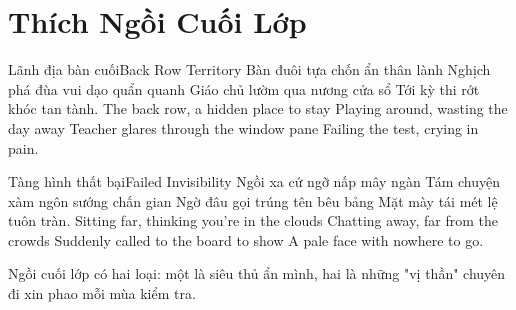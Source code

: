 \chapter{Thích Ngồi Cuối Lớp}

\begin{tutuyetbox}{Lãnh địa bàn cuối}{Back Row Territory}
Bàn đuôi tựa chốn ẩn thân lành
Nghịch phá đùa vui dạo quẩn quanh
Giáo chủ lườm qua nương cửa sổ
Tới kỳ thi rớt khóc tan tành.
\tcblower
The back row, a hidden place to stay 
Playing around, wasting the day away 
Teacher glares through the window pane 
Failing the test, crying in pain.
\end{tutuyetbox}

\begin{tutuyetbox}{Tàng hình thất bại}{Failed Invisibility}
Ngồi xa cứ ngỡ nấp mây ngàn
Tám chuyện xàm ngôn sướng chấn gian
Ngờ đâu gọi trúng tên bêu bảng
Mặt mày tái mét lệ tuôn tràn.
\tcblower
Sitting far, thinking you're in the clouds 
Chatting away, far from the crowds 
Suddenly called to the board to show 
A pale face with nowhere to go.
\end{tutuyetbox}

\begin{ghichu}
Ngồi cuối lớp có hai loại: một là siêu thủ ẩn mình, hai là những "vị thần" chuyên đi xin phao mỗi mùa kiểm tra.
\end{ghichu}